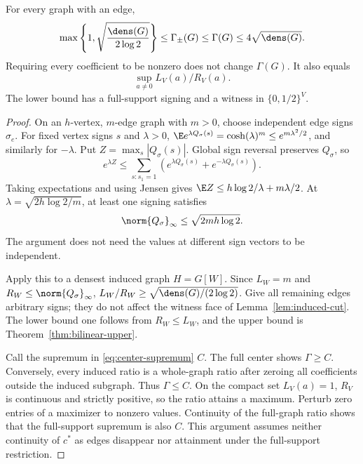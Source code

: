 \begin{theorem}\label{thm:graph-density}
For every graph with an edge,
\begin{equation}\label{eq:graph-density}
 \max\left\{1,\sqrt{\frac{\dens(G)}{2\log2}}\right\}
 \le\Gamma_\pm(G)\le\Gamma(G)\le4\sqrt{\dens(G)}.
\end{equation}
Requiring every coefficient to be nonzero does not change $\Gamma(G)$.
It also equals
\begin{equation}\label{eq:center-supremum}
 \sup_{a\ne0}L_V(a)/R_V(a).
\end{equation}
The lower bound has a full-support signing and a witness in $\{0,1/2\}^V$.
\end{theorem}
\begin{proof}
On an $h$-vertex, $m$-edge graph with $m>0$, choose independent edge signs
$\sigma_e$. For fixed vertex signs $s$ and $\lambda>0$,
$\E e^{\lambda Q_\sigma(s)}=\cosh(\lambda)^m\le e^{m\lambda^2/2}$,
and similarly for $-\lambda$. Put $Z=\max_s|Q_\sigma(s)|$. Global sign
reversal preserves $Q_\sigma$, so
\[
 e^{\lambda Z}\le\sum_{s:s_1=1}
       (e^{\lambda Q_\sigma(s)}+e^{-\lambda Q_\sigma(s)}).
\]
Taking expectations and using Jensen gives
$\E Z\le h\log2/\lambda+m\lambda/2$. At
$\lambda=\sqrt{2h\log2/m}$, at least one signing satisfies
\begin{equation}\label{eq:random-sign}
 \norm{Q_\sigma}_\infty\le\sqrt{2mh\log2}.
\end{equation}
The argument does not need the values at different sign vectors to be
independent.

Apply this to a densest induced graph $H=G[W]$. Since $L_W=m$ and
$R_W\le\norm{Q_\sigma}_\infty$,
$L_W/R_W\ge\sqrt{\dens(G)/(2\log2)}$. Give all remaining edges arbitrary
signs; they do not affect the witness face of Lemma~\ref{lem:induced-cut}.
The lower bound one follows from $R_W\le L_W$, and the upper bound is
Theorem~\ref{thm:bilinear-upper}.

Call the supremum in \eqref{eq:center-supremum} $C$. The full center shows
$\Gamma\ge C$. Conversely, every induced ratio is a whole-graph ratio
after zeroing all coefficients outside the induced subgraph. Thus
$\Gamma\le C$. On the compact set $L_V(a)=1$, $R_V$ is continuous and
strictly positive, so the ratio attains a maximum. Perturb zero entries
of a maximizer to nonzero values. Continuity of the full-graph ratio shows
that the full-support supremum is also $C$. This argument assumes neither
continuity of $c^*$ as edges disappear nor
attainment under the full-support restriction.
\end{proof}

